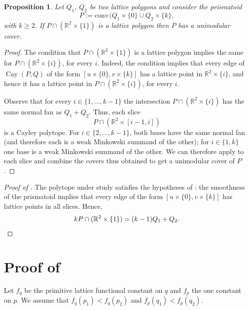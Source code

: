 \documentclass{amsart}
\theoremstyle{plain}
\newtheorem{proposition}[theorem]{Proposition}
\theoremstyle{definition}
\newcommand{\R}{ \ensuremath{\mathbb{R}}}
\newcommand{\conv}{\ensuremath{\mathrm{conv}}\hspace{1pt}}
\newcommand{\cayley}{\operatorname{Cay}}
\begin{document}
\begin{proposition}
\label{prop:prismatoid}
Let $Q_1$, $Q_2$ be two lattice polygons and consider the prismatoid 
\[
P:= \conv(Q_1\times\{0\} \cup Q_2 \times \{k\},
\]
with $k\ge 2$. 
If $P\cap(\R^2\times\{1\})$ is a lattice polygon then $P$ has a unimodular cover.
\end{proposition}

\begin{proof}
The condition that $P\cap(\R^2\times\{1\})$ is a lattice polygon implies the same for $P\cap(\R^2\times\{i\})$, for every $i$. 
Indeed, the condition implies that every edge of $\cayley(P,Q)$ of the form $[u\times \{0\}, v\times \{k\}]$ has a lattice point in $\R^2\times\{i\}$, and hence it has a lattice point in $P\cap(\R^2\times\{i\})$, for every $i$.

Observe that for every $i\in \{1,\dots,k-1\}$ the intersection $P\cap(\R^2\times\{i\})$ has the same normal fan as $Q_1+Q_2$. Thus, each slice
\[
P \cap (\R^2\times[i-1,i])
\]
is a Cayley polytope. For $i\in\{2,\dots,k-1\}$,  both bases have the same normal fan (and therefore each is a weak Minkowski summand of the other); for $i\in \{1,k\}$ one base is a weak Minkowski summand of the other. We can therefore apply  to each slice and combine the covers thus obtained to get a unimodular cover of $P$.
\end{proof}


\begin{proof}[Proof of ]
The polytope under study satisfies the hypotheses of : %
the smoothness of the prismatoid implies that every edge of the form $[u\times \{0\}, v\times \{k\}]$ has lattice points in all slices. 
Hence,
\[
kP \cap(\R^2\times\{1\}) = (k-1)Q_1 + Q_2.
\qedhere
\] 
\end{proof}




\section{Proof of }
\label{sec:the_lemma}
Let $f_q$ be the primitive lattice functional constant on $q$ and $f_p$ the one constant on $p$. We assume that $f_q(p_1) < f_q(p_2)$ and $f_p(q_1) < f_p(q_2)$.
\end{document}
